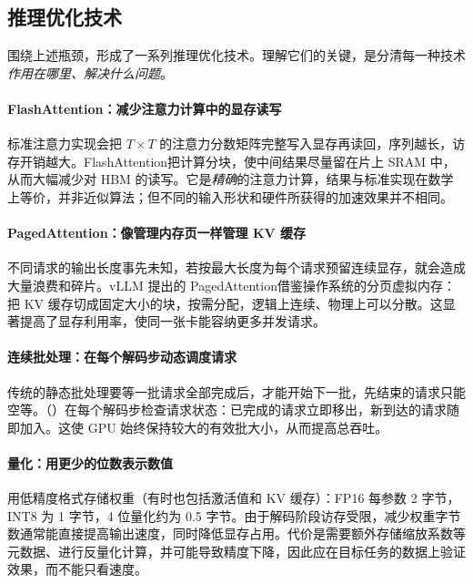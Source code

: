 

\subsection{推理优化技术}
\label{subsec:infer-opt}

围绕上述瓶颈，形成了一系列推理优化技术。理解它们的关键，是分清每一种技术\emph{作用在哪里、解决什么问题}。

\paragraph{FlashAttention：减少注意力计算中的显存读写} 标准注意力实现会把 $T\times T$ 的注意力分数矩阵完整写入显存再读回，序列越长，访存开销越大。FlashAttention\cite{dao2022flashattention}把计算分块，使中间结果尽量留在片上 SRAM 中，从而大幅减少对 HBM 的读写。它是\emph{精确}的注意力计算，结果与标准实现在数学上等价，并非近似算法；但不同的输入形状和硬件所获得的加速效果并不相同。

\paragraph{PagedAttention：像管理内存页一样管理 KV 缓存} 不同请求的输出长度事先未知，若按最大长度为每个请求预留连续显存，就会造成大量浪费和碎片。vLLM 提出的 PagedAttention\cite{kwon2023vllm}借鉴操作系统的分页虚拟内存：把 KV 缓存切成固定大小的块，按需分配，逻辑上连续、物理上可以分散。这显著提高了显存利用率，使同一张卡能容纳更多并发请求。

\paragraph{连续批处理：在每个解码步动态调度请求} 传统的静态批处理要等一批请求全部完成后，才能开始下一批，先结束的请求只能空等。（）\cite{yu2022orca}在每个解码步检查请求状态：已完成的请求立即移出，新到达的请求随即加入。这使 GPU 始终保持较大的有效批大小，从而提高总吞吐。

\paragraph{量化：用更少的位数表示数值} 用低精度格式存储权重（有时也包括激活值和 KV 缓存）：FP16 每参数 2 字节，INT8 为 1 字节，4 位量化约为 0.5 字节。由于解码阶段访存受限，减少权重字节数通常能直接提高输出速度，同时降低显存占用。代价是需要额外存储缩放系数等元数据、进行反量化计算，并可能导致精度下降，因此应在目标任务的数据上验证效果，而不能只看速度\cite{dettmers2023qlora}。

